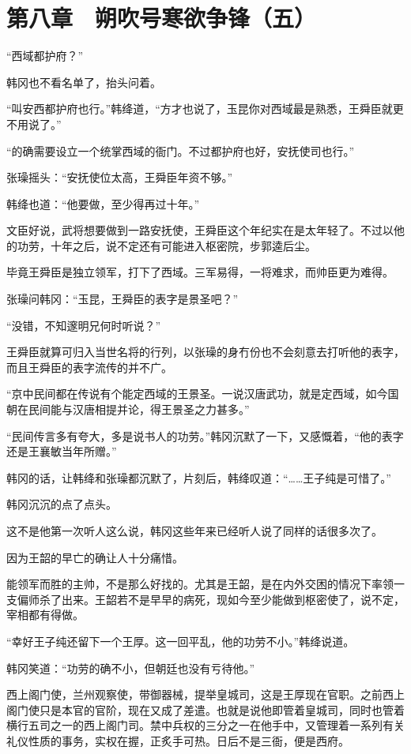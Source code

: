 \section{第八章　朔吹号寒欲争锋（五）}

“西域都护府？”

韩冈也不看名单了，抬头问着。

“叫安西都护府也行。”韩绛道，“方才也说了，玉昆你对西域最是熟悉，王舜臣就更不用说了。”

“的确需要设立一个统掌西域的衙门。不过都护府也好，安抚使司也行。”

张璪摇头：“安抚使位太高，王舜臣年资不够。”

韩绛也道：“他要做，至少得再过十年。”

文臣好说，武将想要做到一路安抚使，王舜臣这个年纪实在是太年轻了。不过以他的功劳，十年之后，说不定还有可能进入枢密院，步郭逵后尘。

毕竟王舜臣是独立领军，打下了西域。三军易得，一将难求，而帅臣更为难得。

张璪问韩冈：“玉昆，王舜臣的表字是景圣吧？”

“没错，不知邃明兄何时听说？”

王舜臣就算可归入当世名将的行列，以张璪的身冇份也不会刻意去打听他的表字，而且王舜臣的表字流传的并不广。

“京中民间都在传说有个能定西域的王景圣。一说汉唐武功，就是定西域，如今国朝在民间能与汉唐相提并论，得王景圣之力甚多。”

“民间传言多有夸大，多是说书人的功劳。”韩冈沉默了一下，又感慨着，“他的表字还是王襄敏当年所赠。”

韩冈的话，让韩绛和张璪都沉默了，片刻后，韩绛叹道：“……王子纯是可惜了。”

韩冈沉沉的点了点头。

这不是他第一次听人这么说，韩冈这些年来已经听人说了同样的话很多次了。

因为王韶的早亡的确让人十分痛惜。

能领军而胜的主帅，不是那么好找的。尤其是王韶，是在内外交困的情况下率领一支偏师杀了出来。王韶若不是早早的病死，现如今至少能做到枢密使了，说不定，宰相都有得做。

“幸好王子纯还留下一个王厚。这一回平乱，他的功劳不小。”韩绛说道。

韩冈笑道：“功劳的确不小，但朝廷也没有亏待他。”

西上阁门使，兰州观察使，带御器械，提举皇城司，这是王厚现在官职。之前西上阁门使只是本官的官阶，现在又成了差遣。也就是说他即管着皇城司，同时也管着横行五司之一的西上阁门司。禁中兵权的三分之一在他手中，又管理着一系列有关礼仪性质的事务，实权在握，正炙手可热。日后不是三衙，便是西府。

